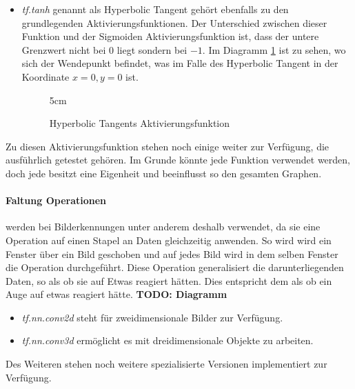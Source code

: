 \begin{itemize}
	\item \textit{tf.tanh} genannt als Hyperbolic Tangent gehört ebenfalls zu den grundlegenden Aktivierungsfunktionen. 
	Der Unterschied zwischen dieser Funktion und der Sigmoiden Aktivierungsfunktion ist, dass der untere Grenzwert nicht bei $0$ liegt sondern bei $-1$. 
	Im Diagramm \ref{fig:Hyperbolic Tangents Aktivierungsfunktion} ist zu sehen, wo sich der Wendepunkt befindet, was im Falle des Hyperbolic Tangent in der Koordinate $x = 0, y = 0$ ist. 
\begin{figure}
	\centering
	\resizebox {\linewidth} {5cm} {
	}
	\caption{Hyperbolic Tangents Aktivierungsfunktion}
	\label{fig:Hyperbolic Tangents Aktivierungsfunktion}
\end{figure}
\end{itemize}
\phantom \newline

\noindent
Zu diesen Aktivierungsfunktion stehen noch einige weiter zur Verfügung, die ausführlich getestet gehören. 
Im Grunde könnte jede Funktion verwendet werden, doch jede besitzt eine Eigenheit und beeinflusst so den gesamten Graphen. 

\paragraph{Faltung Operationen} werden bei Bilderkennungen unter anderem deshalb verwendet, da sie eine Operation auf einen Stapel an Daten gleichzeitig anwenden. 
So wird wird ein Fenster über ein Bild geschoben und auf jedes Bild wird in dem selben Fenster die Operation durchgeführt. 
Diese Operation generalisiert die darunterliegenden Daten, so als ob sie auf Etwas reagiert hätten. 
Dies entspricht dem als ob ein Auge auf etwas reagiert hätte. 
\textbf{TODO: Diagramm}
\begin{itemize}
	\item \textit{tf.nn.conv2d} steht für zweidimensionale Bilder zur Verfügung. 
	\item \textit{tf.nn.conv3d} ermöglicht es mit dreidimensionale Objekte zu arbeiten.
\end{itemize}

Des Weiteren stehen noch weitere spezialisierte Versionen implementiert zur Verfügung.

